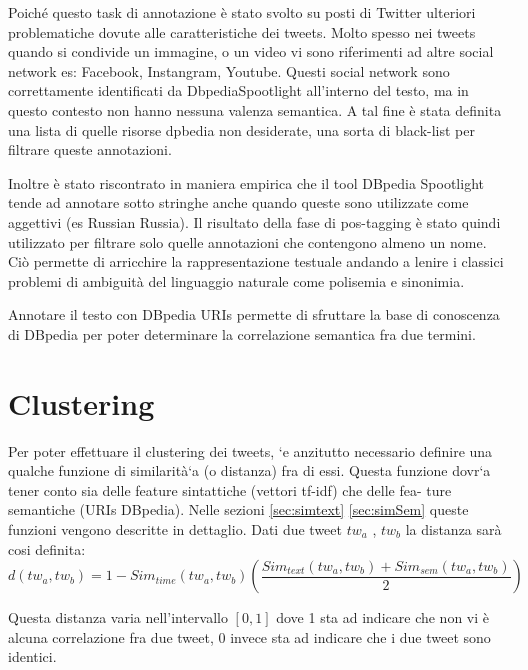 Poiché questo task di annotazione è stato svolto su posti di Twitter  ulteriori problematiche dovute alle caratteristiche dei tweets.
Molto spesso nei tweets quando si condivide un immagine, o un video vi sono riferimenti ad altre social network es: Facebook, Instangram, Youtube.
Questi social network sono correttamente identificati  da DbpediaSpootlight all'interno del testo, ma in questo contesto non hanno nessuna valenza semantica.  A tal fine è stata definita una lista di quelle risorse dpbedia non desiderate, una sorta di black-list per filtrare queste annotazioni.


Inoltre è stato riscontrato in maniera empirica che il tool DBpedia Spootlight tende ad annotare  sotto stringhe anche quando queste sono utilizzate come aggettivi (es Russian   Russia).
Il risultato della fase di pos-tagging è stato quindi utilizzato per filtrare solo quelle annotazioni che contengono almeno un nome. 
Ciò permette di arricchire la rappresentazione testuale andando a lenire i classici problemi di ambiguità del linguaggio naturale come polisemia e sinonimia.  

Annotare il testo con DBpedia URIs permette di sfruttare la base di conoscenza di DBpedia per poter determinare la correlazione semantica fra due termini. 


 
 

 


 


  
 
\section{Clustering}
Per poter effettuare il clustering dei tweets, `e anzitutto necessario definire
una qualche funzione di similarità`a (o distanza) fra di essi. Questa funzione
dovr`a tener conto sia delle feature sintattiche (vettori tf-idf) che delle fea-
ture semantiche (URIs DBpedia). Nelle sezioni \ref{sec:simtext} \ref{sec:simSem} queste funzioni vengono descritte in dettaglio. 
Dati due tweet $tw_a$ , $tw_b$ la distanza sarà cosi
definita:
\begin{equation}
\label{eq:distanceTweet}
d(tw_a,tw_b)=1-Sim_{time}(tw_a,tw_b)\left(\frac{Sim_{text}(tw_a,tw_b)+Sim_{sem}(tw_a,tw_b)}{2}\right)
\end{equation}

Questa distanza varia nell'intervallo $[0, 1]$ dove 1 sta ad indicare che non vi è alcuna correlazione fra due tweet, 0 invece sta ad indicare che i due tweet sono identici.

